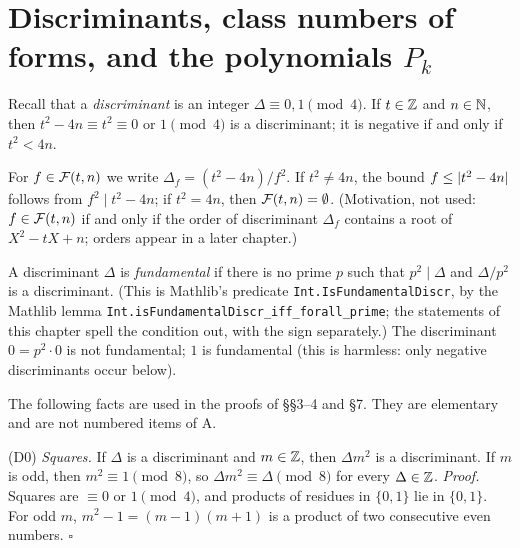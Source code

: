 \section{Discriminants, class numbers of forms, and the polynomials \texorpdfstring{$P_k$}{P\_k}}\label{sec:ef-discr}

Recall that a \emph{discriminant} is an integer $\Delta\equiv0,1\pmod4$. If $t\in\mathbb{Z}$ and $n\in\mathbb{N}$, then $t^2-4n\equiv t^2\equiv0$ or $1\pmod4$ is a
discriminant; it is negative if and only if $t^2<4n$.

\begin{definition}
\end{definition}
\noindent For $f\in\mathcal{F}(t,n)$ we write $\Delta_f=(t^2-4n)/f^2$. If $t^2\ne4n$, the bound $f\le\lvert t^2-4n\rvert$ follows from $f^2\mid t^2-4n$; if
$t^2=4n$, then $\mathcal{F}(t,n)=\emptyset$. (Motivation, not used: $f\in\mathcal{F}(t,n)$ if and only if the order of discriminant $\Delta_f$ contains a root
of $X^2-tX+n$; orders appear in a later chapter.)

\label{par:ef-fundamental}A discriminant $\Delta$ is \emph{fundamental} if there is no prime $p$ such that $p^2\mid\Delta$ and
$\Delta/p^2$ is a discriminant. (This is Mathlib's predicate \texttt{Int.IsFundamentalDiscr}, by the Mathlib lemma
\texttt{Int.isFundamentalDiscr\_iff\_forall\_prime}; the statements of this chapter spell the condition out, with the sign separately.) The
discriminant $0=p^2\cdot0$ is not fundamental; $1$ is fundamental (this is harmless: only negative discriminants occur below).

The following facts are used in the proofs of \S\S3--4 and \S7. They are elementary and are not numbered items of A.

\label{fact:ef-D0}(D0) \emph{Squares.} If $\Delta$ is a discriminant and $m\in\mathbb{Z}$, then $\Delta m^2$ is a discriminant. If $m$ is
odd, then $m^2\equiv1\pmod8$, so $\Delta m^2\equiv\Delta\pmod8$ for every $\Delta\in\mathbb{Z}$. \emph{Proof.} Squares are $\equiv0$ or $1\pmod4$, and products
of residues in $\{0,1\}$ lie in $\{0,1\}$. For odd $m$, $m^2-1=(m-1)(m+1)$ is a product of two consecutive even numbers. $\square$

